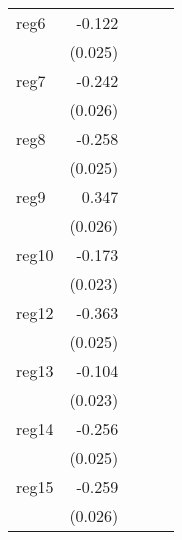 {\begin{longtable}{l*{4}{D{.}{.}{-1}}}
\addlinespace
reg6        &      -0.122\sym{***}&                     &                     &                     \\
            &     (0.025)         &                     &                     &                     \\
\addlinespace
reg7        &      -0.242\sym{***}&                     &                     &                     \\
            &     (0.026)         &                     &                     &                     \\
\addlinespace
reg8        &      -0.258\sym{***}&                     &                     &                     \\
            &     (0.025)         &                     &                     &                     \\
\addlinespace
reg9        &       0.347\sym{***}&                     &                     &                     \\
            &     (0.026)         &                     &                     &                     \\
\addlinespace
reg10       &      -0.173\sym{***}&                     &                     &                     \\
            &     (0.023)         &                     &                     &                     \\
\addlinespace
reg12       &      -0.363\sym{***}&                     &                     &                     \\
            &     (0.025)         &                     &                     &                     \\
\addlinespace
reg13       &      -0.104\sym{***}&                     &                     &                     \\
            &     (0.023)         &                     &                     &                     \\
\addlinespace
reg14       &      -0.256\sym{***}&                     &                     &                     \\
            &     (0.025)         &                     &                     &                     \\
\addlinespace
reg15       &      -0.259\sym{***}&                     &                     &                     \\
            &     (0.026)         &                     &                     &                     \\

\end{longtable}}

